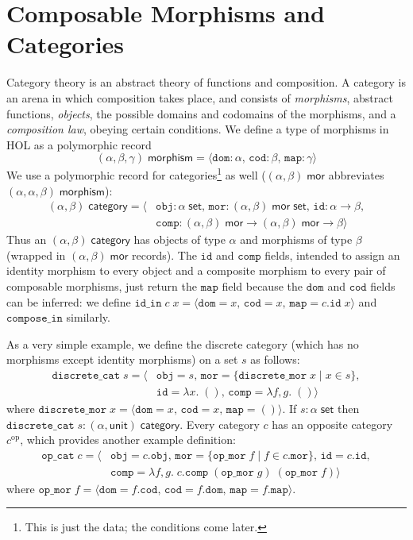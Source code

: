 \documentclass[twoside,titlepage,11pt]{article}
\begin{document}
\section{Composable Morphisms and Categories}%
Category theory is an abstract theory of functions and composition.
A category is an arena in which composition takes place, and consists of \emph{morphisms}, abstract functions, \emph{objects}, the possible domains and codomains of the morphisms, and a \emph{composition law}, obeying certain conditions.
We define a type of morphisms in HOL as a polymorphic record $$(\alpha,\beta,\gamma)\;\mathsf{morphism}=\langle\mathtt{dom}:\alpha,\,\mathtt{cod}:\beta,\,\mathtt{map}:\gamma\rangle$$
We use a polymorphic record for categories\footnote{This is just the data; the conditions come later.} as well ($(\alpha,\beta)\;\mathsf{mor}$ abbreviates $(\alpha,\alpha,\beta)\;\mathsf{morphism}$):
\begin{align*}
(\alpha,\beta)\;\mathsf{category}=\langle&\mathtt{obj}:\alpha\;\mathsf{set},\,\mathtt{mor}:(\alpha,\beta)\;\mathsf{mor}\;\mathsf{set},\,\mathtt{id}:\alpha\to\beta,\\&\mathtt{comp}:(\alpha,\beta)\;\mathsf{mor}\to(\alpha,\beta)\;\mathsf{mor}\to\beta\rangle
\end{align*}
Thus an $(\alpha,\beta)\;\mathsf{category}$ has objects of type $\alpha$ and morphisms of type $\beta$ (wrapped in $(\alpha,\beta)\;\mathsf{mor}$ records).
The $\mathtt{id}$ and $\mathtt{comp}$ fields, intended to assign an identity morphism to every object and a composite morphism to every pair of composable morphisms, just return the $\mathtt{map}$ field because the $\mathtt{dom}$ and $\mathtt{cod}$ fields can be inferred: we define $\mathtt{id\_in}\;c\;x=\langle\mathtt{dom}=x,\,\mathtt{cod}=x,\,\mathtt{map}=c.\mathtt{id}\;x\rangle$ and $\mathtt{compose\_in}$ similarly.

As a very simple example, we define the discrete category (which has no morphisms except identity morphisms) on a set $s$ as follows:
\begin{align*}
\mathtt{discrete\_cat}\;s=\langle&\mathtt{obj}=s,\,\mathtt{mor}=\{\mathtt{discrete\_mor}\;x\mid x\in s\},\\&\mathtt{id}=\lambda{x}.\;(),\,\mathtt{comp}=\lambda{f,g}.\;()\rangle
\end{align*}
where $\mathtt{discrete\_mor}\;x=\langle\mathtt{dom}=x,\,\mathtt{cod}=x,\,\mathtt{map}=()\rangle$.
If $s:\alpha\;\mathsf{set}$ then $\mathtt{discrete\_cat}\;s:(\alpha,\mathsf{unit})\;\mathsf{category}$.
Every category $c$ has an opposite category $c^{\mathrm{op}}$, which provides another example definition:
\begin{align*}
\mathtt{op\_cat}\;c=\langle&\mathtt{obj}=c.\mathtt{obj},\,\mathtt{mor}=\{\mathtt{op\_mor}\;f\mid f\in c.\mathtt{mor}\},\,\mathtt{id}=c.\mathtt{id},\\&\mathtt{comp}=\lambda{f,g}.\;c.\mathtt{comp}\;(\mathtt{op\_mor}\;g)\;(\mathtt{op\_mor}\;f)\rangle
\end{align*}
where $\mathtt{op\_mor}\;f=\langle\mathtt{dom}=f.\mathtt{cod},\,\mathtt{cod}=f.\mathtt{dom},\,\mathtt{map}=f.\mathtt{map}\rangle$.
\end{document}
